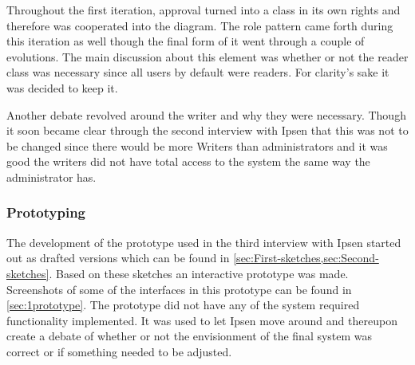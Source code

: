 Throughout the first iteration, approval turned into a class in its own rights and therefore was cooperated into the diagram.
The role pattern came forth during this iteration as well though the final form of it went through a couple of evolutions.
The main discussion about this element was whether or not the reader class was necessary since all users by default were readers.
For clarity's sake it was decided to keep it.

Another debate revolved around the writer and why they were necessary.
Though it soon became clear through the second interview with Ipsen that this was not to be changed since there would be more Writers than administrators and it was good the writers did not have total access to the system the same way the administrator has.

\subsubsection*{Prototyping}
The development of the prototype used in the third interview with Ipsen started out as drafted versions which can be found in \cref{sec:First-sketches,sec:Second-sketches}.
Based on these sketches an interactive prototype was made.
Screenshots of some of the interfaces in this prototype can be found in \cref{sec:1prototype}.
The prototype did not have any of the system required functionality implemented.
It was used to let Ipsen move around and thereupon create a debate of whether or not the envisionment of the final system was correct or if something needed to be adjusted.
